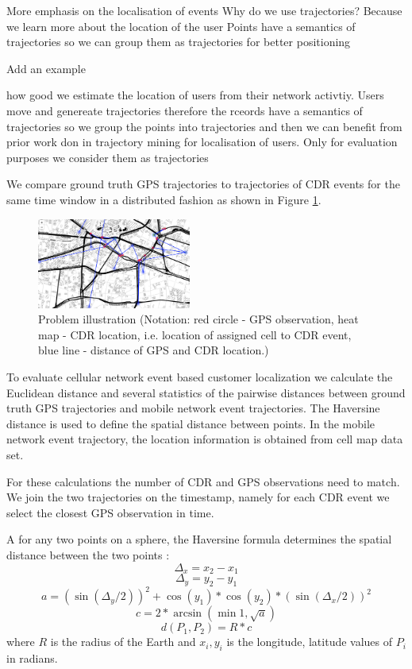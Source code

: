 More emphasis on the localisation of events
Why do we use trajectories? Because we learn more about the location of the user  
Points have a semantics of trajectories so we can group them as trajectories for better positioning

Add an example

how good we estimate the location of users from their network activtiy. Users move and genereate trajectories therefore the rceords have a semantics of trajectories so we group the points into trajectories and then we can benefit from prior work don in trajectory mining for localisation of users. 
Only for evaluation purposes we consider them as trajectories


We compare ground truth GPS trajectories to trajectories of CDR events for the same time window in a distributed fashion as shown in Figure \ref{fig:problem}. 
\begin{figure}[h]
    \centering
    \includegraphics[width=0.45\textwidth]{images/localization_eval.png}
    \caption{Problem illustration (Notation: red circle - GPS observation, heat map - CDR location, i.e. location of assigned cell to CDR event, blue line - distance of GPS and CDR location.)}
    \label{fig:problem}
\end{figure}

To evaluate cellular network event based customer localization we calculate the Euclidean distance and several statistics of the pairwise distances between ground truth GPS trajectories and mobile network event trajectories. The Haversine distance is used to define the spatial distance between points. In the mobile network event trajectory, the location information is obtained from cell map data set.

For these calculations the number of CDR and GPS observations need to match. We join the two trajectories on the timestamp, namely for each CDR event we select the closest GPS observation in time.

\begin{definition}
A for any two points on a sphere, the Haversine formula determines the spatial distance between the two points \cite{haversine}:
    \[\Delta_{x} = x_{2} - x_{1}\]
    \[\Delta_{y} = y_{2} - y_{1}\]
    \[a = (\sin(\Delta_{y}/2))^2 + \cos{(y_{1})} * \cos{(y_{2})} * (\sin{(\Delta_{x}/2)})^2 \]
    \[c = 2 * \arcsin{(\min{1,\sqrt{a}})}\]
    \[d(P_{1}, P_{2}) = R * c\]
    where $R$ is the radius of the Earth and $x_{i}, y_{i}$ is the longitude, latitude values of $P_{i}$ in radians.
\end{definition}

